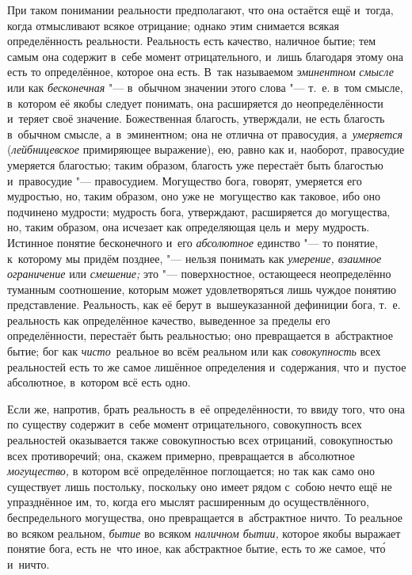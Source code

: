 \label{bkm:bm73b}При таком понимании реальности предполагают, что она
остаётся ещё и~тогда, когда отмысливают всякое отрицание; однако этим снимается
всякая определённость реальности. Реальность есть качество, наличное бытие; тем
самым она содержит в~себе момент отрицательного, и~лишь благодаря этому она
есть то определённое, которое она есть. В~так называемом
{\em эминентном} {\em смысле} или как {\em бесконечная} "--- в~обычном значении
этого слова "--- т.~е. в~том смысле, в~котором её якобы следует понимать, она
расширяется до неопределённости и~теряет своё значение. Божественная благость,
утверждали, не есть благость в~обычном смысле, а~в~эминентном; она не отлична
от правосудия, а~{\em умеряется} ({\em лейбницевское} примиряющее выражение),
ею, равно как и, наоборот, правосудие умеряется благостью; таким образом,
благость уже перестаёт быть благостью и~правосудие "--- правосудием. Могущество
бога, говорят, умеряется его мудростью, но, таким образом, оно уже
не~могущество как таковое, ибо оно подчинено мудрости; мудрость бога,
утверждают, расширяется до могущества, но, таким образом, она исчезает как
определяющая цель и~меру мудрость. Истинное понятие бесконечного и~его
{\em абсолютное} единство "--- то понятие, к~которому мы придём позднее, "---
нельзя понимать как {\em умерение, взаимное ограничение} или {\em смешение;}
это "--- поверхностное, остающееся неопределённо туманным соотношение, которым
может удовлетворяться лишь чуждое понятию представление. Реальность, как её
берут в~вышеуказанной дефиниции бога, т.~е. реальность как определённое
качество, выведенное за пределы его определённости, перестаёт быть реальностью;
оно превращается в~абстрактное бытие; бог как {\em чисто}~реальное во всём
реальном или как {\em совокупность} всех реальностей есть то же самое лишённое
определения и~содержания, что и~пустое абсолютное, в~котором всё есть одно.

Если же, напротив, брать реальность в~её определённости, то ввиду того, что
она по существу содержит в~себе момент отрицательного, совокупность всех
реальностей оказывается также совокупностью всех отрицаний, совокупностью всех
противоречий; она, скажем примерно, превращается в~абсолютное {\em могущество,}
в котором всё определённое поглощается; но так как само оно существует лишь
постольку, поскольку оно имеет рядом с~собою нечто ещё не упразднённое им, то,
когда его мыслят расширенным до осуществлённого, беспредельного могущества, оно
превращается в~абстрактное ничто. То реальное во всяком реальном, {\em бытие}
во всяком {\em наличном бытии,} которое якобы выражает понятие бога, есть
не~что иное, как абстрактное бытие, есть то же самое, чт\'{о} и~ничто.

